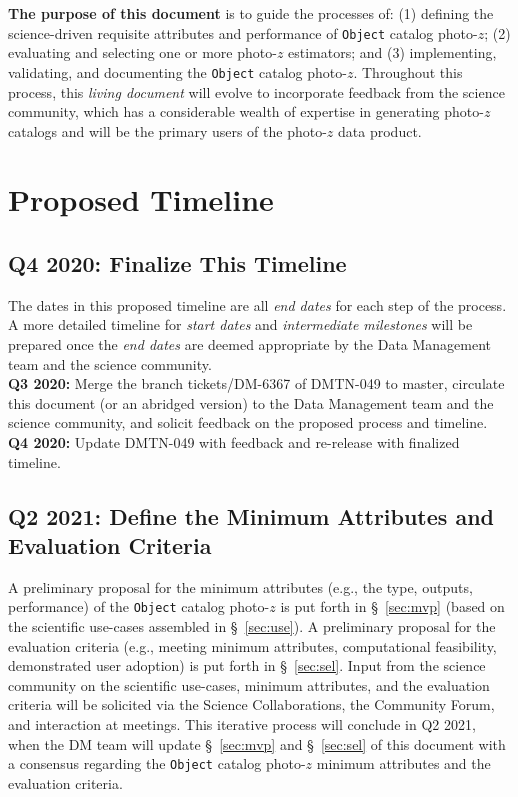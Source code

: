 \documentclass[DM,lsstdraft,toc]{lsstdoc}
\begin{document}
{\bf The purpose of this document} is to guide the processes of: (1) defining the science-driven requisite attributes and performance of {\tt Object} catalog photo-$z$; (2) evaluating and selecting one or more photo-$z$ estimators; and (3) implementing, validating, and documenting the {\tt Object} catalog photo-$z$. 
Throughout this process, this {\it living document} will evolve to incorporate feedback from the science community, which has a considerable wealth of expertise in generating photo-$z$ catalogs and will be the primary users of the photo-$z$ data product.


\clearpage
\section{Proposed Timeline}\label{sec:time}

\subsection{Q4 2020: Finalize This Timeline}\label{ssec:time_time}

The dates in this proposed timeline are all {\it end dates} for each step of the process.
A more detailed timeline for {\it start dates} and {\it intermediate milestones} will be prepared once the {\it end dates} are deemed appropriate by the Data Management team and the science community. \\
{\bf Q3 2020:} Merge the branch tickets/DM-6367 of DMTN-049 to master, circulate this document (or an abridged version) to the Data Management team and the science community, and solicit feedback on the proposed process and timeline. \\
{\bf Q4 2020:} Update DMTN-049 with feedback and re-release with finalized timeline.

\subsection{Q2 2021: Define the Minimum Attributes and Evaluation Criteria}\label{ssec:time_mvp}

A preliminary proposal for the minimum attributes (e.g., the type, outputs, performance) of the {\tt Object} catalog photo-$z$ is put forth in \S~\ref{sec:mvp} (based on the scientific use-cases assembled in \S~\ref{sec:use}).
A preliminary proposal for the evaluation criteria (e.g., meeting minimum attributes, computational feasibility, demonstrated user adoption) is put forth in \S~\ref{sec:sel}.
Input from the science community on the scientific use-cases, minimum attributes, and the evaluation criteria will be solicited via the Science Collaborations, the Community Forum, and interaction at meetings.
This iterative process will conclude in Q2 2021, when the DM team will update \S~\ref{sec:mvp} and \S~\ref{sec:sel} of this document with a consensus regarding the {\tt Object} catalog photo-$z$ minimum attributes and the evaluation criteria.
\end{document}
